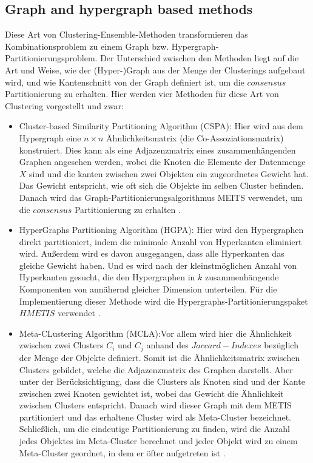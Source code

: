 \documentclass[runningheads]{llncs}
\begin{document}
\subsection{Graph and hypergraph based methods}
Diese Art von Clustering-Ensemble-Methoden transformieren das Kombinationsproblem zu einem Graph bzw. Hypergraph-Partitionierungsproblem. Der Unterschied zwischen den Methoden liegt auf die Art und Weise, wie der (Hyper-)Graph aus der Menge der Clusterings aufgebaut wird, und wie Kantenschnitt von der Graph definiert ist, um die $consensus$ Partitionierung zu erhalten.
Hier werden vier Methoden für diese Art von Clustering vorgestellt und zwar: 
\begin{itemize}
	\item Cluster-based Similarity Partitioning Algorithm (CSPA): Hier wird aus dem Hypergraph eine $n \times n$ Ähnlichkeitsmatrix (die Co-Assoziationsmatrix) konstruiert. Dies kann als eine Adjazenzmatrix eines zusammenhängenden Graphen angesehen werden, wobei die Knoten die Elemente der Datenmenge $X$ sind und die kanten zwischen zwei Objekten ein zugeordnetes Gewicht hat. Das Gewicht entspricht, wie oft sich die Objekte im selben Cluster befinden. Danach wird das Graph-Partitionierungsalgorithmus MEITS verwendet, um die $consensus$ Partitionierung zu erhalten \cite{vega2011survey}.
	
	\item HyperGraphs Partitioning Algorithm (HGPA): Hier wird den Hypergraphen direkt partitioniert, indem die minimale Anzahl  von Hyperkanten eliminiert wird. Außerdem wird es davon ausgegangen, dass alle Hyperkanten das gleiche Gewicht haben. Und es wird nach der kleinstmöglichen Anzahl von Hyperkanten gesucht, die den Hypergraphen in $k$ zusammenhängende Komponenten von
	annähernd gleicher Dimension unterteilen. Für die Implementierung dieser Methode wird die Hypergraphs-Partitionierungspaket $HMETIS$ verwendet \cite{vega2011survey}.
	
	\item  Meta-CLustering Algorithm (MCLA):Vor allem wird hier die Ähnlichkeit zwischen zwei Clusters $C_{i}$ und $C_{j}$ anhand des $Jaccard-Indexes$ bezüglich der Menge der Objekte definiert. Somit ist die Ähnlichkeitsmatrix zwischen Clusters gebildet, welche die Adjazenzmatrix des Graphen darstellt. Aber unter der Berücksichtigung, dass die Clusters als Knoten sind und der Kante zwischen zwei Knoten gewichtet ist, wobei das Gewicht die Ähnlichkeit zwischen Clusters entspricht. Danach wird dieser Graph mit dem METIS partitioniert und das erhaltene Cluster wird als Meta-Cluster bezeichnet.\\
	Schließlich, um die eindeutige Partitionierung zu finden, wird die Anzahl jedes Objektes im Meta-Cluster berechnet und jeder Objekt wird zu einem Meta-Cluster geordnet, in dem er öfter aufgetreten ist \cite{vega2011survey}.
	      

\end{itemize}
\end{document}
